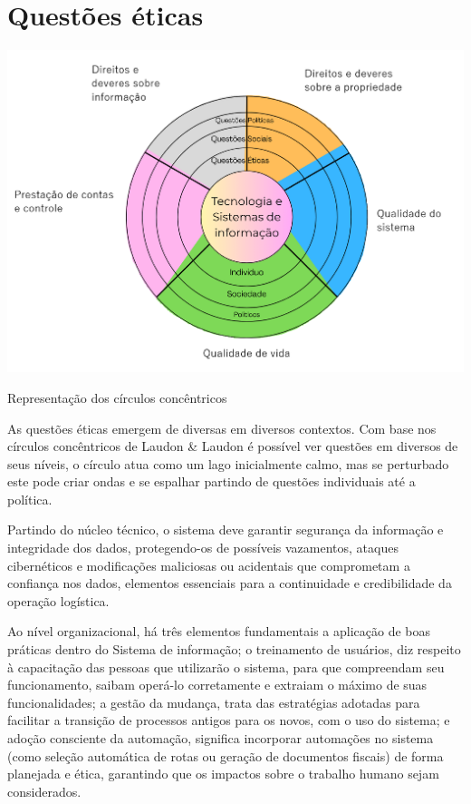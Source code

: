 \documentclass[conference]{IEEEtran}
\begin{document}
\section{Questões éticas}
\begin{center}
    \includegraphics[width=0.8\linewidth]{Novos Concorrentes.png}
    \caption{Representação dos círculos concêntricos}
    \label{fig:circulos-concêntricos}
\end{center}
As questões éticas emergem de diversas em diversos contextos. Com base nos círculos concêntricos de Laudon \& Laudon é possível ver questões em diversos de seus níveis, o círculo atua como um lago inicialmente calmo, mas se perturbado este pode criar ondas e se espalhar partindo de questões individuais até a política.

Partindo do núcleo técnico, o sistema deve garantir segurança da informação e integridade dos dados, protegendo-os de possíveis vazamentos, ataques cibernéticos e modificações maliciosas ou acidentais que comprometam a confiança nos dados, elementos essenciais para a continuidade e credibilidade da operação logística.

Ao nível organizacional, há três elementos fundamentais a aplicação de boas práticas dentro do Sistema de informação; o treinamento de usuários, diz respeito à capacitação das pessoas que utilizarão o sistema, para que compreendam seu funcionamento, saibam operá-lo corretamente e extraiam o máximo de suas funcionalidades; a gestão da mudança, trata das estratégias adotadas para facilitar a transição de processos antigos para os novos, com o uso do sistema; e adoção consciente da automação, significa incorporar automações no sistema (como seleção automática de rotas ou geração de documentos fiscais) de forma planejada e ética, garantindo que os impactos sobre o trabalho humano sejam considerados.
\end{document}
